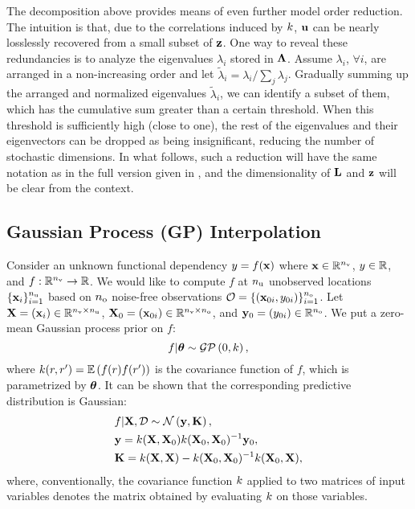 The decomposition above provides means of even further model order reduction. The intuition is that, due to the correlations induced by $\fCov$, $\mathbf{u}$ can be nearly losslessly recovered from a small subset of $\mathbf{z}$. One way to reveal these redundancies is to analyze the eigenvalues $\lambda_i$ stored in $\mathbf{\Lambda}$. Assume $\lambda_i$, $\forall i$, are arranged in a non-increasing order and let $\tilde{\lambda}_i = \lambda_i / \sum_j \lambda_j$. Gradually summing up the arranged and normalized eigenvalues $\tilde{\lambda}_i$, we can identify a subset of them, which has the cumulative sum greater than a certain threshold. When this threshold is sufficiently high (close to one), the rest of the eigenvalues and their eigenvectors can be dropped as being insignificant, reducing the number of stochastic dimensions. In what follows, such a reduction will have the same notation as in the full version given in , and the dimensionality of $\mathbf{L}$ and $\mathbf{z}$ will be clear from the context.

\subsection{Gaussian Process (GP) Interpolation} 
Consider an unknown functional dependency $y = f(\mathbf{x})$ where $\mathbf{x} \in \mathbb{R}^{n_\text{v}}$, $y \in \mathbb{R}$, and $f: \mathbb{R}^{n_\text{v}} \to \mathbb{R}$. We would like to compute $f$ at ${n_\text{u}}$ unobserved locations $\{ \mathbf{x}_i \}_{i = 1}^{n_\text{u}}$ based on ${n_\text{o}}$ noise-free observations $\mathcal{O} = \{ (\mathbf{x}_{0i}, y_{0i}) \}_{i = 1}^{n_\text{o}}$. Let $\mathbf{X} = (\mathbf{x}_i) \in \mathbb{R}^{{n_\text{v}} \times {n_\text{u}}}$, $\mathbf{X}_0 = (\mathbf{x}_{0i}) \in \mathbb{R}^{{n_\text{v}} \times {n_\text{o}}}$, and $\mathbf{y}_0 = (y_{0i}) \in \mathbb{R}^{n_\text{o}}$. We put a zero-mean Gaussian process prior on $f$:
\[
  f | \vparam \sim \gaussianp{0}{\fCov},
\]
where $\fCov{\r, \r'} = \E{f(\r) f(\r')}$ is the covariance function of $f$, which is parametrized by ${\boldsymbol\theta}$. It can be shown \cite{mackay2003, rasmussen2006} that the corresponding predictive distribution is Gaussian:
\begin{align*}
  & f | \m{X}, \Data \sim \gaussian{\v{y}}{\mCov}, \\
  & \v{y} = \fCov{\m{X}, \m{X}_0} \fCov{\m{X}_0, \m{X}_0}^{-1} \v{y}_0, \\
  & \mCov = \fCov{\m{X}, \m{X}} - \fCov{\m{X}_0, \m{X}_0}^{-1} \fCov{\m{X}_0, \m{X}},
\end{align*}
where, conventionally, the covariance function $\fCov$ applied to two matrices of input variables denotes the matrix obtained by evaluating $\fCov$ on those variables.
